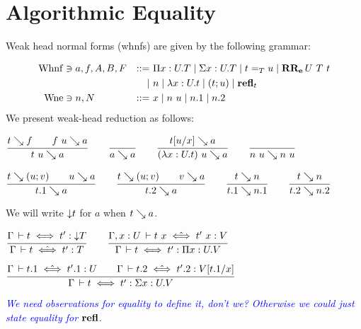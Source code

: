\documentclass[a4paper,english]{lipics-utf8x}
\newcommand\meta[1]{\noindent\textcolor{blue}{\emph{#1}}}
\begin{document}
  \section{Algorithmic Equality}


  Weak head normal forms (whnfs) are given by the following grammar:

  \begin{align*}
    \operatorname{Whnf} &\ni a,f,A,B,F &::=~& \Pi x:U.T \mid \Sigma x:U.T \mid t =_T u
                           \mid \operatorname{\mathbf{RR_e}}U\ T\ t \\
        &&\mid~& n \mid \lambda x:U.t \mid (t;u) \mid \operatorname{\mathbf{refl}}_t \\
    \operatorname{Wne}  &\ni n,N &::=~& x \mid n~u \mid n.1 \mid n.2
  \end{align*}
  We present weak-head reduction as follows:

  \begin{center}
  \(
    \ru{t \rew f \qquad
        f~u \rew a
      }{t~u \rew a}
    \qquad
    \ru{}{a \rew a}
    \qquad
    \ru{t[u/x] \rew a
      }{(\lambda x:U.t)~u \rew a}
    \qquad
    \ru{}{n~u \rew n~u}
  \)
  \end{center}

  \begin{center}
  \(
    \ru{t \rew (u;v) \qquad
        u \rew a
      }{t.1 \rew a}
    \qquad
    \ru{t \rew (u;v) \qquad
        v \rew a
      }{t.2 \rew a}
    \qquad
    \ru{t \rew n
      }{t.1 \rew n.1}
    \qquad
    \ru{t \rew n
      }{t.2 \rew n.2}
  \)
  \end{center}
  We will write ${\downarrow} t$ for $a$ when $t \searrow a$.


  \begin{center}
  \(
    \ru{\Gamma \der t \iff t' : \red T
      }{\Gamma \der t \hiff t' : T}
    \qquad
    \ru{\Gamma, x:U \der t~x \hiff t'~x : V
      }{\Gamma \der t \iff t' : \Pi x:U.V}
  \)
  \end{center}

  \begin{center}
  \(
    \ru{\Gamma \der t.1 \hiff t'.1 : U \qquad
        \Gamma \der t.2 \hiff t'.2 : V[t.1/x]
      }{\Gamma \der t \iff t' : \Sigma x:U.V}
  \)
  \end{center}

  \meta{We need observations for equality to define it, don't we?
  Otherwise we could just state equality for $\operatorname{\mathbf{refl}}$.}
\end{document}

